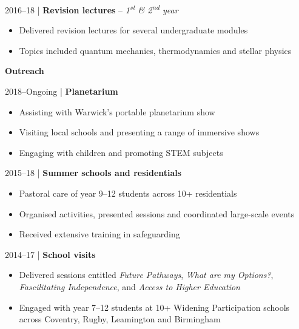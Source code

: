 \documentclass[10pt,a4paper]{altacv}
\begin{document}
\smallskip

\small 2016--18 | \textbf{Revision lectures} -- \textit{1\textsuperscript{st} \& 2\textsuperscript{nd} year} \\
\smallskip
\begin{itemize}
	\item Delivered revision lectures for several undergraduate modules
	\item Topics included quantum mechanics, thermodynamics and stellar physics
\end{itemize}

\divider

\normalsize \textbf{Outreach}

\medskip

\small 2018--Ongoing | \textbf{Planetarium} \\
\smallskip
\begin{itemize}
	\item Assisting with Warwick's portable planetarium show 
	\item Visiting local schools and presenting a range of immersive shows
	\item Engaging with children and promoting STEM subjects
\end{itemize}

\smallskip

\small 2015--18 | \textbf{Summer schools and residentials} \\
\smallskip
\begin{itemize}
	\item Pastoral care of year 9--12 students across 10+ residentials
	\item Organised activities, presented sessions and coordinated large-scale events
	\item Received extensive training in safeguarding
\end{itemize}

\smallskip

\small 2014--17 | \textbf{School visits} \\
\smallskip
\begin{itemize}
	\item Delivered sessions entitled \textit{Future Pathways}, \textit{What are my Options?}, \textit{Fascilitating Independence}, and \textit{Access to Higher Education} 
	\item Engaged with year 7--12 students at 10+ Widening Participation schools across Coventry, Rugby, Leamington and Birmingham
\end{itemize}
\end{document}
